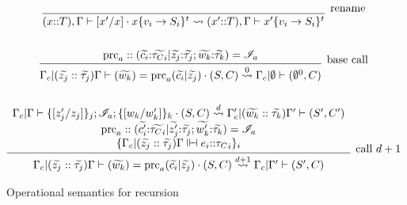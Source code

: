 \begin{figure}[htbp]
\[
\begin{gathered}
\infer[{\raisebox{2ex}{rename}}]
   {\qresultsin{(x{::}T),\Gamma \qentail\qop{[x'/x]}{\qsnodeij{x}{v_i}{S_i}{t}}} 
         {(x'{::}T),\Gamma\qentail\qsnodeij{x'}{v_i}{S_i}{t}}}
   {}\\ 
\\
\infer[{\raisebox{2ex}{base call}}]
   {\qresultsind{0}{\Gamma_c| (\qvec{z_j}::\qvec{\tau_j})\Gamma \qentail 
              \qop{(\qvec{w_k}) = \text{prc}_a(\qvec{c_i}|\qvec{z_j})}{(S,C)}}
         {\Gamma_c|\emptyset\qentail (\emptyset^{0},C)}}
   {\text{prc}_a ::(\qvec{c_i}{:}\qvec{{\tcls}_i} | \qvec{z_j}{:}\qvec{\tau_j} ; 
        \qvec{w_k}{:}\qvec{\tau_k}) = \qins_a}\\ 
\\
\infer[{\raisebox{2ex}{call $d+1$}}]
   {\qresultsind{d+1}{\Gamma_c|(\qvec{z_j}::\qvec{\tau_j})\Gamma\qentail 
         \qop{(\qvec{w_k}) = \text{prc}_a(\qvec{c_i}|\qvec{z_j})}{(S,C)}}
         {\Gamma_c|\Gamma'\qentail  (S',C)}}
   {\stackthreec{\qresultsind{d}{\Gamma_c|\Gamma\qentail
             \qop{\{[z_j'/z_j]\}_j;\qins_a;\{[w_k/w_k']\}_k}{(S,C)}}
         {\Gamma_c'|(\qvec{w_k}::\qvec{\tau_k})\Gamma'\qentail (S',C')}}
       {\text{prc}_a ::(\qvec{c_i'}{:}\qvec{{\tcls}_i} | 
                 \qvec{z_j'}{:}\qvec{\tau_j} ; \qvec{w_k'}{:}\qvec{\tau_k}) = \qins_a}
{\{\Gamma_c | (\qvec{z_j}::\qvec{\tau_j})\Gamma \eentail e_i{::}{\tcls}_i\}_i}}
\end{gathered}
\]
\caption{Operational semantics for recursion}\label{fig:qsiterationtransitions}
\end{figure}

